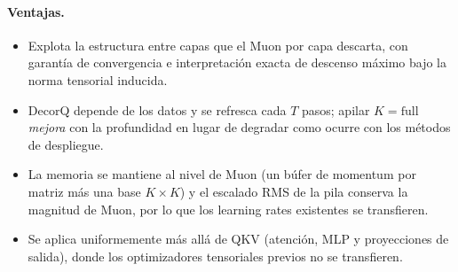 \paragraph{Ventajas.}
\begin{itemize}[leftmargin=*]
\item Explota la estructura entre capas que el Muon por capa descarta, con garantía de
  convergencia e interpretación exacta de descenso máximo bajo la norma tensorial
  inducida.
\item DecorQ depende de los datos y se refresca cada $T$ pasos; apilar
  $K{=}\mathrm{full}$ \emph{mejora} con la profundidad en lugar de degradar como ocurre
  con los métodos de despliegue.
\item La memoria se mantiene al nivel de Muon (un búfer de momentum por matriz más una
  base $K \times K$) y el escalado RMS de la pila conserva la magnitud de Muon, por lo que
  los learning rates existentes se transfieren.
\item Se aplica uniformemente más allá de QKV (atención, MLP y proyecciones de salida),
  donde los optimizadores tensoriales previos no se transfieren.
\end{itemize}

